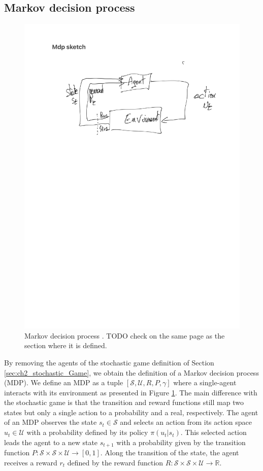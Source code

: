 \subsection{Markov decision process} \label{sec:ch2_mdp}
\begin{figure}
    \centering
    \includegraphics{tex_thesis/figures/ch2/mdp_sketch.pdf}
    \caption{Markov decision process \citep{sutton2018reinforcement}. TODO check on the same page as the section where it is defined.}
    \label{fig:ch2_mdp}
\end{figure}

By removing the agents of the stochastic game definition of Section \ref{sec:ch2_stochastic_Game}, we obtain the definition of a Markov decision process (MDP).
We define an MDP as a tuple $[\mathcal{S}, \mathcal{U}, R, P, \gamma]$ where a single-agent interacts with its environment as presented in Figure \ref{fig:ch2_mdp}.
The main difference with the stochastic game is that the transition and reward functions still map two states but only a single action to a probability and a real, respectively.
The agent of an MDP observes the state $s_t \in \mathcal{S}$ and selects an action from its action space $u_t \in \mathcal{U}$ with a probability defined by its policy $\pi(u_t|s_t)$.
This selected action leads the agent to a new state $s_{t+1}$ with a probability given by the transition function $P:\mathcal{S} \times \mathcal{S} \times \mathcal{U} \rightarrow [0,1]$.
Along the transition of the state, the agent receives a reward $r_t$ defined by the reward function $R:\mathcal{S} \times \mathcal{S} \times \mathcal{U} \rightarrow \mathbb{R}$.

